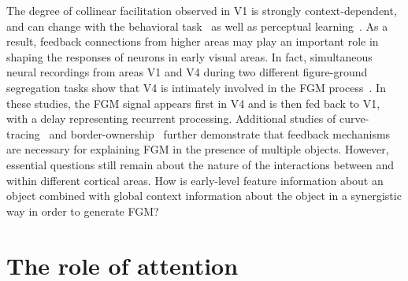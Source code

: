 The degree of collinear facilitation observed in V1 is strongly context-dependent, and can change with the behavioral task~\citep{Li_etal04, Li_etal06} as well as perceptual learning~\citep{Li_etal08a, Yan_etal14}. As a result, feedback connections from higher areas may play an important role in shaping the responses of neurons in early visual areas. In fact, simultaneous neural recordings from areas V1 and V4 during two different figure-ground segregation tasks show that V4 is intimately involved in the FGM process~\citep{Poort_etal12, Chen_etal14}. In these studies, the FGM signal appears first in V4 and is then fed back to V1, with a delay representing recurrent processing. Additional studies of curve-tracing~\citep{Roelfsema_etal98} and border-ownership~\citep{Zhou_etal00, Qiu_etal07, Zhang_vonderHeydt10} further demonstrate that feedback mechanisms are necessary for explaining FGM in the presence of multiple objects. However, essential questions still remain about the nature of the interactions between and within different cortical areas. How is early-level feature information about an object combined with global context information about the object in a synergistic way in order to generate FGM?

\section{The role of attention}

